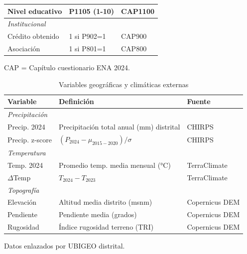 \documentclass[10pt,a4paper]{article}
\begin{document}
\begin{table}[H]
\begin{threeparttable}
\begin{tabular}{p{3cm}p{7cm}p{2.5cm}}
Nivel educativo & P1105 (1-10) & CAP1100 \\
\midrule
\multicolumn{3}{l}{\textit{Institucional}} \\
Crédito obtenido & 1 si P902=1 & CAP900 \\
Asociación & 1 si P801=1 & CAP800 \\
\bottomrule
\end{tabular}
\begin{tablenotes}
\footnotesize
\item CAP = Capítulo cuestionario ENA 2024.
\end{tablenotes}
\end{threeparttable}
\end{table}

\begin{table}[H]
\centering
\caption{Variables geográficas y climáticas externas}
\label{tab:geo_definitions}
\begin{threeparttable}
\small
\begin{tabular}{p{3.5cm}p{7cm}p{3cm}}
\toprule
\textbf{Variable} & \textbf{Definición} & \textbf{Fuente} \\
\midrule
\multicolumn{3}{l}{\textit{Precipitación}} \\
Precip. 2024 & Precipitación total anual (mm) distrital & CHIRPS \\
Precip. z-score & $(P_{2024} - \mu_{2015-2020}) / \sigma$ & CHIRPS \\
\midrule
\multicolumn{3}{l}{\textit{Temperatura}} \\
Temp. 2024 & Promedio temp. media mensual (°C) & TerraClimate \\
$\Delta$Temp & $T_{2024} - T_{2023}$ & TerraClimate \\
\midrule
\multicolumn{3}{l}{\textit{Topografía}} \\
Elevación & Altitud media distrito (msnm) & Copernicus DEM \\
Pendiente & Pendiente media (grados) & Copernicus DEM \\
Rugosidad & Índice rugosidad terreno (TRI) & Copernicus DEM \\
\bottomrule
\end{tabular}
\begin{tablenotes}
\footnotesize
\item Datos enlazados por UBIGEO distrital.
\end{tablenotes}
\end{threeparttable}
\end{table}
\end{document}
